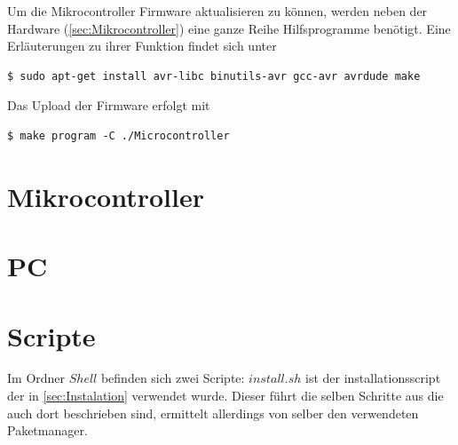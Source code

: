 \documentclass[12pt, a4paper, oneside]{report}
\begin{document}
Um die Mikrocontroller Firmware aktualisieren zu können, werden neben der Hardware (\autoref{sec:Mikrocontroller})  eine ganze Reihe Hilfsprogramme benötigt. Eine Erläuterungen zu ihrer Funktion findet sich unter \cite{UbuntuAVR}
\begin{lstlisting}
$ sudo apt-get install avr-libc binutils-avr gcc-avr avrdude make
\end{lstlisting}
Das Upload der Firmware erfolgt mit
\begin{lstlisting}
$ make program -C ./Microcontroller
\end{lstlisting}

\section{Mikrocontroller}
\section{PC}
\section{Scripte}
Im Ordner $Shell$ befinden sich zwei Scripte:
$install.sh$ ist der installationsscript der in \autoref{sec:Instalation} verwendet wurde. 
Dieser führt die selben Schritte aus die auch dort beschrieben sind, 
ermittelt allerdings von selber den verwendeten Paketmanager.
\end{document}
